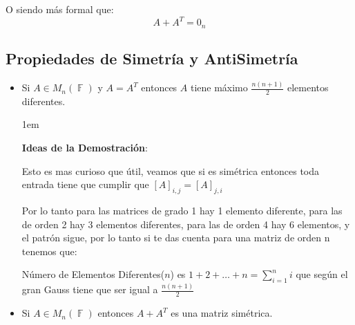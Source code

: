 \documentclass[12pt, fleqn]{report}                             %
\newenvironment{SmallIndentation}[1][0.75em]                    %
        {\begin{adjustwidth}{#1}{}\begin{footnotesize}}             %
        {\end{footnotesize}\end{adjustwidth}}                       %
\theoremstyle{break}                                            %
\DeclareMathOperator \GenericField {\mathbb{F}}                 %
\begin{document}
                O siendo más formal que:
                \begin{equation*}
                    A + A^T = 0_n
                \end{equation*}



                \clearpage
                \subsection{Propiedades de Simetría y AntiSimetría}

                    \begin{itemize}

                        \item Si $A \in M_{n}(\GenericField)$ y $A = A^T$ entonces $A$ tiene máximo 
                            $\frac{n(n+1)}{2}$ elementos diferentes.

                            \begin{SmallIndentation}[1em]
                                \textbf{Ideas de la Demostración}:

                                Esto es mas curioso que útil, veamos que si es simétrica entonces toda
                                entrada tiene que cumplir que $[A]_{i, j} = [A]_{j,i}$

                                Por lo tanto para las matrices de grado 1 hay 1 elemento diferente, 
                                para las de orden 2 hay 3 elementos diferentes, para las de orden 4 hay 6
                                elementos, y el patrón sigue, por lo tanto si te das cuenta para 
                                una matriz de orden n tenemos que:

                                Número de Elementos Diferentes($n$) es $1+2+\dots+n = \sum_{i=1}^{n} i$
                                que según el gran Gauss tiene que ser igual a $\frac{n(n+1)}{2}$


                            \end{SmallIndentation}


                        \item Si $A \in M_{n}(\GenericField)$ entonces $A+A^T$ es una matriz simétrica. 


\end{itemize}
\end{document}
